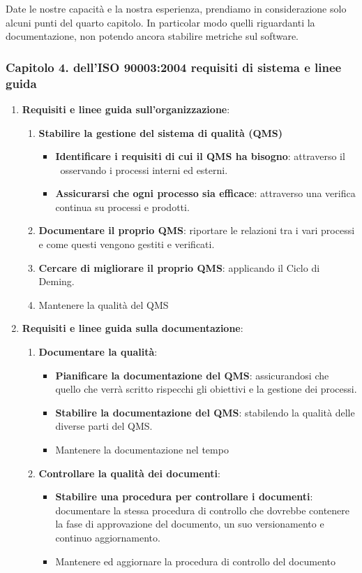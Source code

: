 	Date le nostre capacità e la nostra esperienza, prendiamo in considerazione solo alcuni punti del quarto capitolo. In particolar modo quelli riguardanti la documentazione, non potendo ancora stabilire metriche sul software.
	
	\subsubsection{Capitolo 4. dell'ISO 90003:2004 requisiti di sistema e linee guida}
	
	\begin{enumerate}
		\item \textbf{Requisiti e linee guida sull'organizzazione}:
		\begin{enumerate}
			\item \textbf{Stabilire la gestione del sistema di qualità (QMS)}
			\begin{itemize}
				\item \textbf{Identificare i requisiti di cui il QMS ha bisogno}: attraverso il \PdQ~osservando i processi interni ed esterni.
				\item \textbf{Assicurarsi che ogni processo sia efficace}: attraverso una verifica continua su processi e prodotti.
			\end{itemize}
			\item \textbf{Documentare il proprio QMS}: riportare le relazioni tra i vari processi e come questi vengono gestiti e verificati.
			\item \textbf{Cercare di migliorare il proprio QMS}: applicando il Ciclo di Deming.
			\item Mantenere la qualità del QMS
		\end{enumerate} 
		\newpage
		\item \textbf{Requisiti e linee guida sulla documentazione}:
		\begin{enumerate}
			\item \textbf{Documentare la qualità}:
			\begin{itemize}
				\item \textbf{Pianificare la documentazione del QMS}: assicurandosi che quello che verrà scritto rispecchi gli obiettivi e la gestione dei processi.
				\item \textbf{Stabilire la documentazione del QMS}: stabilendo la qualità delle diverse parti del QMS.
				\item Mantenere la documentazione nel tempo
			\end{itemize}
			
			\item \textbf{Controllare la qualità dei documenti}:
			\begin{itemize}
				\item \textbf{Stabilire una procedura per controllare i documenti}: documentare la stessa procedura di controllo che dovrebbe contenere la fase di approvazione del documento, un suo versionamento e continuo aggiornamento.
				\item Mantenere ed aggiornare la procedura di controllo del documento
			\end{itemize}
		\end{enumerate}
	\end{enumerate}

